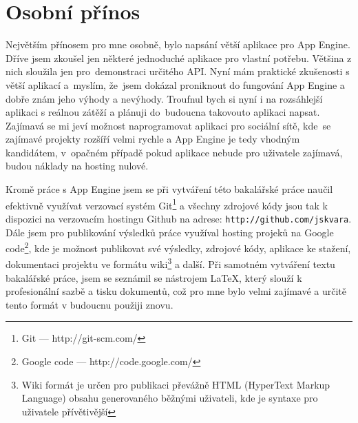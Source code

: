 \section{Osobní přínos}
Největším přínosem pro mne osobně, bylo napsání větší aplikace pro App Engine. Dříve jsem zkoušel jen některé jednoduché aplikace pro vlastní potřebu. Většina z nich sloužila jen pro~demonstraci určitého API. Nyní mám praktické zkušenosti s větší aplikací a~myslím, že~jsem dokázal proniknout do fungování App Engine a dobře znám jeho výhody a nevýhody. Troufnul bych si nyní i na rozsáhlejší aplikaci s reálnou zátěží a plánuji do~budoucna takovouto aplikaci napsat. Zajímavá se mi jeví možnost naprogramovat aplikaci pro sociální sítě, kde~se zajímavé projekty rozšíří velmi rychle a App Engine je tedy vhodným kandidátem, v~opačném případě pokud aplikace nebude pro uživatele zajímavá, budou náklady na hosting nulové.

Kromě práce s App Engine jsem se při vytváření této bakalářské práce naučil efektivně využívat verzovací systém Git\footnote{Git --- http://git-scm.com/} a všechny zdrojové kódy jsou tak k dispozici na verzovacím hostingu Github na adrese: \verb|http://github.com/jskvara|. Dále jsem pro publikování výsledků práce využíval hosting projeků na Google code\footnote{Google code --- http://code.google.com/}, kde je možnost publikovat své výsledky, zdrojové kódy, aplikace ke stažení, dokumentaci projektu ve formátu wiki\footnote{Wiki formát je určen pro publikaci převážně HTML (HyperText Markup Language) obsahu generovaného běžnými uživateli, kde je syntaxe pro uživatele přívětivější} a další. Při samotném vytváření textu bakalářské práce, jsem se seznámil se nástrojem \LaTeX, který slouží k profesionální sazbě a tisku dokumentů, což pro mne bylo velmi zajímavé a určitě tento formát v budoucnu použiji znovu.